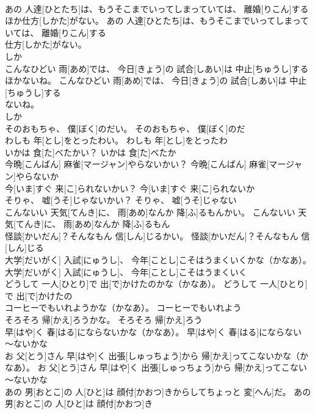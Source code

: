 \documentclass[8pt]{extreport}
\begin{document}
\begin{CJK}{UTF8}{min}
\\	あの 人達[ひとたち]は、もうそこまでいってしまっていては、 離婚[りこん]するほか仕方[しかた]がない。	あの 人達[ひとたち]は、もうそこまでいってしまっていては、 離婚[りこん]する
\\	仕方[しかた]がない。	
\\	しか
\\	こんなひどい 雨[あめ]では、 今日[きょう]の 試合[しあい]は 中止[ちゅうし]するほかないね。	こんなひどい 雨[あめ]では、 今日[きょう]の 試合[しあい]は 中止[ちゅうし]する
\\	ないね。	
\\	しか
\\	そのおもちゃ、 僕[ぼく]のだい。	そのおもちゃ、 僕[ぼく]のだ
\\	わしも 年[とし]をとったわい。	わしも 年[とし]をとったわ
\\	いかは 食[た]べたかい？	いかは 食[た]べたか
\\	今晩[こんばん] 麻雀[マージャン]やらないかい？	今晩[こんばん] 麻雀[マージャン]やらないか
\\	今[いま]すぐ 来[こ]られないかい？	今[いま]すぐ 来[こ]られないか
\\	そりゃ、 嘘[うそ]じゃないかい？	そりゃ、 嘘[うそ]じゃない
\\	こんないい 天気[てんき]に、 雨[あめ]なんか 降[ふ]るもんかい。	こんないい 天気[てんき]に、 雨[あめ]なんか 降[ふ]るもん
\\	怪談[かいだん]？そんなもん 信[しん]じるかい。	怪談[かいだん]？そんなもん 信[しん]じる
\\	大学[だいがく] 入試[にゅうし]、 今年[ことし]こそはうまくいくかな（かなあ）。	大学[だいがく] 入試[にゅうし]、 今年[ことし]こそはうまくいく
\\	どうして 一人[ひとり]で 出[で]かけたのかな（かなあ）。	どうして 一人[ひとり]で 出[で]かけたの
\\	コーヒーでもいれようかな（かなあ）。	コーヒーでもいれよう
\\	そろそろ 帰[かえ]ろうかな。	そろそろ 帰[かえ]ろう
\\	早[はや]く 春[はる]にならないかな（かなあ）。	早[はや]く 春[はる]にならない
\\	～ないかな
\\	お 父[とう]さん 早[はや]く 出張[しゅっちょう]から 帰[かえ]ってこないかな（かなあ）。	お 父[とう]さん 早[はや]く 出張[しゅっちょう]から 帰[かえ]ってこない
\\	～ないかな
\\	あの 男[おとこ]の 人[ひと]は 顔付[かおつ]きからしてちょっと 変[へん]だ。	あの 男[おとこ]の 人[ひと]は 顔付[かおつ]き

\end{CJK}
\end{document}
